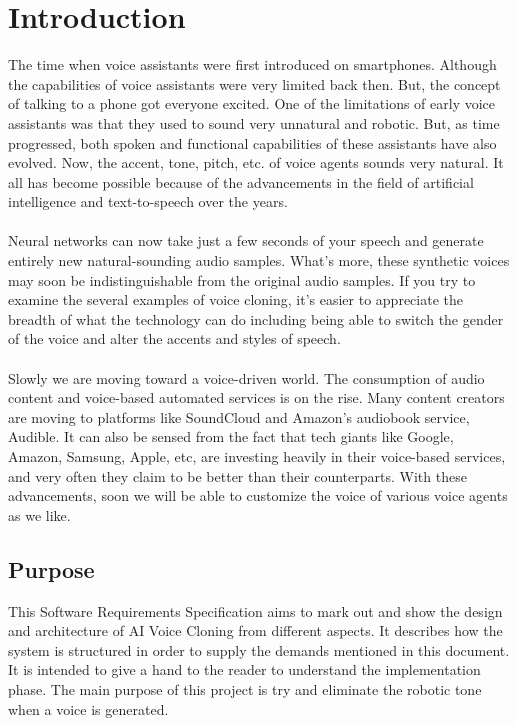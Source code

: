 \documentclass[12pt]{report}
\begin{document}
\chapter{Introduction}
The time when voice assistants were first introduced on smartphones. Although the capabilities of voice assistants were very limited back then. But, the concept of talking to a phone got everyone excited. One of the limitations of early voice assistants was that they used to sound very unnatural and robotic. But, as time progressed, both spoken and functional capabilities of these assistants have also evolved. Now, the accent, tone, pitch, etc. of voice agents sounds very natural. It all has become possible because of the advancements in the field of artificial intelligence and text-to-speech over the years.\\   \\
Neural networks can now take just a few seconds of your speech and generate entirely new natural-sounding audio samples. What’s more, these synthetic voices may soon be indistinguishable from the original audio samples. If you try to examine the several examples of voice cloning, it’s easier to appreciate the breadth of what the technology can do including being able to switch the gender of the voice and alter the accents and styles of speech.\\ \\
Slowly we are moving toward a voice-driven world. The consumption of audio content and voice-based automated services is on the rise. Many content creators are moving to platforms like SoundCloud and Amazon’s audiobook service, Audible. It can also be sensed from the fact that tech giants like Google, Amazon, Samsung, Apple, etc, are investing heavily in their voice-based services, and very often they claim to be better than their counterparts.
With these advancements, soon we will be able to customize the voice of various voice agents as we like.

\section{Purpose}
This Software Requirements Specification aims to mark out and show the design and architecture of AI Voice Cloning from different aspects. It describes how the system is structured in order to supply the demands mentioned in this document. It is intended to give a hand to the reader to understand the implementation phase. The main purpose of this project is try and eliminate the robotic tone when a voice is generated.\\
\end{document}
